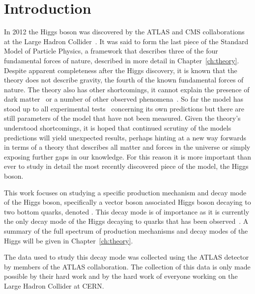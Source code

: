 \chapter{Introduction}%
\label{ch:intro}

In 2012 the Higgs boson was discovered by the ATLAS and CMS collaborations at
the Large Hadron Collider~\cite{DiscoHiggsATLAS, DiscoHiggsCMS}. It was said to
form the last piece of the Standard Model of Particle Physics, a framework that
describes three of the four fundamental forces of nature, described in more
detail in Chapter~\ref{ch:theory}. Despite apparent completeness after the
Higgs discovery, it is known that the theory does not describe gravity, the
fourth of the known fundamental forces of nature. The theory also has other
shortcomings, it cannot explain the presence of dark matter~\cite{DM-ev-sloan,
  DM-ev-nucleosynth, DM-ev-supernova, DM-ev-scaffold, DM-ev-direct,
  DM-ev-strong-lens, DM-ev-candidates, DM-ev-PDG, DM-ev-Zwicky,
  DM-ev-nonbaryonic, DM-ev-particle} or a number of other observed
phenomena~\cite{anom-BD-branching, anom-Dtau-excess, anom-g-2,
  anom-proton-radius, anom-bsll-trans}. So far the model has stood up to all
experimental tests~\cite{EWtests, 1998-SMtests} concerning its own predictions
but there are still parameters of the model that have not been measured. Given
the theory's understood shortcomings, it is hoped that continued scrutiny of the
models predictions will yield unexpected results, perhaps hinting at a new
way forwards in terms of a theory that describes all matter and forces in the
universe or simply exposing further gaps in our knowledge. For this reason it is
more important than ever to study in detail the most recently discovered piece
of the model, the Higgs boson.

This work focuses on studying a specific production mechanism and decay mode of
the Higgs boson, specifically a vector boson associated Higgs boson decaying to
two bottom quarks, denoted \VHbb. This decay mode is of importance as it is
currently the only decay mode of the Higgs decaying to quarks that has been
observed~\cite{vhbb-obs}. A summary of the full spectrum of production
mechanisms and decay modes of the Higgs will be given in
Chapter~\ref{ch:theory}.

The data used to study this decay mode was collected using the ATLAS detector by
members of the ATLAS collaboration. The collection of this data is only made
possible by their hard work and by the hard work of everyone working on the
Large Hadron Collider at CERN.

